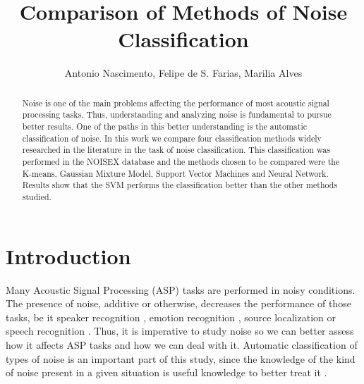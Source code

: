 \documentclass[12pt]{article}
\title{Comparison of Methods of Noise Classification}
\author{Antonio Nascimento\inst{1}, Felipe de S. Farias\inst{1}, Marilia Alves \inst{2}}
\begin{document}
 

\maketitle

\begin{abstract}


Noise is one of the main problems affecting the performance of most acoustic signal processing tasks. Thus, understanding and analyzing noise is fundamental to pursue better results. One of the paths in this better understanding is the automatic classification of noise. In this work we compare four classification methods widely researched in the literature in the task of noise classification. This classification was performed in the NOISEX database and the methods chosen to be compared were the K-means, Gaussian Mixture Model, Support Vector Machines and Neural Network. Results show that the SVM performs the classification better than the other methods studied.

\end{abstract}
     


\section{Introduction} \label{sec:intro}




Many Acoustic Signal Processing (ASP) tasks are performed in noisy conditions. The presence of noise, additive or otherwise, decreases the performance of those tasks, be it speaker recognition \cite{ming2007robust}, emotion recognition \cite{schuller2010cross}, source localization \cite{benesty2000adaptive} or speech recognition \cite{friesen2001speech}. Thus, it is imperative to study noise so we can better assess how it affects ASP tasks and how we can deal with it. Automatic classification of types of noise is an important part of this study, since the knowledge of the kind of noise present in a given situation is useful knowledge to better treat it \cite{may2012noise}.
\end{document}
